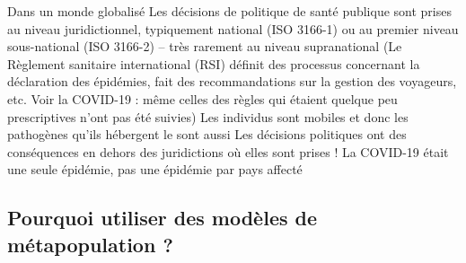 \documentclass[aspectratio=169]{beamer}\usepackage[]{graphicx}\usepackage[]{xcolor}
\begin{document}
\begin{frame}{Dans un monde globalisé}
\bbullet
Les décisions de politique de santé publique sont prises au niveau juridictionnel, typiquement national (ISO 3166-1) ou au premier niveau sous-national (ISO 3166-2) -- très rarement au niveau supranational
\vfill
(Le Règlement sanitaire international (RSI) définit des processus concernant la déclaration des épidémies, fait des recommandations sur la gestion des voyageurs, etc. Voir la COVID-19 : même celles des règles qui étaient quelque peu prescriptives n'ont pas été suivies)
\vfill
\bbullet
Les individus sont mobiles et donc les pathogènes qu'ils hébergent le sont aussi
\vfill
\bbullet 
Les décisions politiques ont des conséquences en dehors des juridictions où elles sont prises !
\vfill
\bbullet
La COVID-19 était une seule épidémie, pas une épidémie par pays affecté
\end{frame}




\subsection{Pourquoi utiliser des modèles de métapopulation ?}

\end{document}
